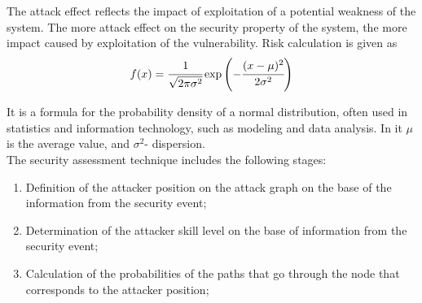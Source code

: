 \documentclass[preprint]{oscmjournal}
\begin{document}
The attack effect reflects the impact of exploitation of a potential weakness of the system. The more attack effect on the security property of the system, the more impact caused by exploitation of the vulnerability. Risk calculation is given as
\begin{equation}
\label{eq:3}
  f(x)=\cfrac{1}{\sqrt{2 \pi \sigma^2}}\exp\left(-\cfrac{(x-\mu)^2}{2\sigma^2}\right)
\end{equation}

It is a formula for the probability density of a normal distribution, often used in statistics and information technology, such as modeling and data analysis. In it $\mu$ is the average value, and $\sigma^2$- dispersion.\\

The security assessment technique includes the following stages: 
\begin{enumerate}
    \item Definition of the attacker position on the attack graph on the base of the information from the security event;
    \item Determination of the attacker skill level on the base of information from the security event;
    \item Calculation of the probabilities of the paths that go through the node that corresponds to the attacker position;
\end{enumerate}
\end{document}
